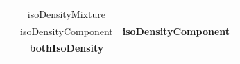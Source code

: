 \begin{itemize}
\begin{tabular}{|c|c|c|}
& isoDensityMixture &  \\
 &  isoDensityComponent & {\bf isoDensityComponent}  \\
& {\bf bothIsoDensity} &  \\


\hline

\end{tabular}






















\end{itemize}
